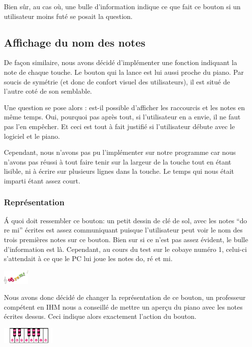 \documentclass{article}
\begin{document}
Bien sûr, au cas où, une bulle d'information indique ce que fait ce bouton si un utilisateur moins futé se posait la question.

\subsection{Affichage du nom des notes}
De façon similaire, nous avons décidé d'implémenter une fonction indiquant la note de chaque touche. Le bouton qui la lance est lui 
aussi proche du piano. Par soucis de symétrie (et donc de confort visuel des utilisateurs), il est situé de l'autre coté de son semblable.

Une question se pose alors : est-il possible d'afficher les raccourcis et les notes en même temps.
Oui, pourquoi pas après tout, si l'utilisateur en a envie, il ne faut pas l'en empêcher. Et ceci est tout à fait justifié si 
l'utilisateur débute avec le logiciel et le piano.


Cependant, nous n'avons pas pu l'implémenter sur notre programme car nous n'avons pas réussi à tout faire tenir sur la largeur de la touche
tout en étant lisible, ni à écrire sur plusieurs lignes dans la touche. Le temps qui nous était imparti étant assez court.

\subsubsection{Représentation}
\'A quoi doit ressembler ce bouton: un petit dessin de clé de sol, avec les notes ``do re mi'' écrites est assez communiquant puisque
l'utilisateur peut voir le nom des trois premières notes sur ce bouton. Bien sur si ce n'est pas assez évident, le bulle d'information
est là. Cependant, au cours du test sur le cobaye numéro 1, celui-ci s'attendait à ce que le PC lui joue les notes do, ré et mi.
\begin{center}
\includegraphics[width = 50px]{./images/doremi.png}
\end{center}


Nous avons donc décidé de changer la représentation de ce bouton, un professeur compétent en IHM nous a conseillé de mettre
 un aperçu du piano avec les notes écrites dessus. Ceci indique alors exactement l'action du bouton.
 
\begin{center}
\includegraphics[width = 100px]{./images/doremi2.png}
\end{center}
\end{document}
